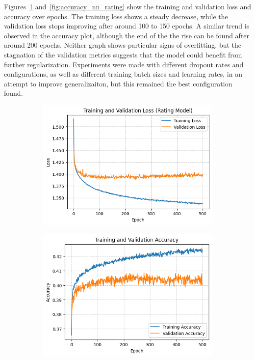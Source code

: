 Figures~\ref{fig:loss_nn_rating} and~\ref{fig:accuracy_nn_rating}
show the training and validation loss and accuracy over epochs.
The training loss shows a steady decrease, while the validation loss
stops improving after around 100 to 150 epochs.
A similar trend is observed in the accuracy plot, although the
end of the the rise can be found after around 200 epochs.
Neither graph shows particular signs of overfitting, but
the stagnation of the validation metrics suggests that the model
could benefit from further regularization.
Experiments were made with different dropout rates and configurations,
as well as different training batch sizes and learning rates,
in an attempt to improve generalizaiton, but this remained the
best configuration found.\\

\begin{figure}[H]
    \centering
    \begin{subfigure}[b]{0.48\textwidth}
        \centering
        \includegraphics[width=\textwidth]{plotsss/loss_rating.png}
        \label{fig:loss_nn_rating}
    \end{subfigure}
    \hfill
    \begin{subfigure}[b]{0.48\textwidth}
        \centering
        \includegraphics[width=\textwidth]{plotsss/accuracy_rating.png}

\end{subfigure}
\end{figure}
